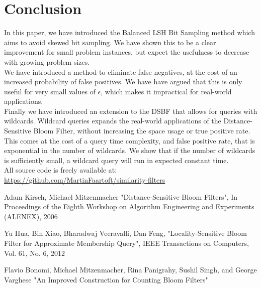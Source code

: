 \documentclass[a4paper,11pt]{article}
\begin{document}
\section{Conclusion}

In this paper, we have introduced the Balanced LSH Bit Sampling method which aims to avoid skewed bit sampling. We have shown this to be a clear improvement for small problem instances, but expect the usefulness to decrease with growing problem sizes.\\

We have introduced a method to eliminate false negatives, at the cost of an increased probability of false positives. We have have argued that this is only useful for very small values of $\epsilon$, which makes it impractical for real-world applications.\\

Finally we have introduced an extension to the DSBF that allows for queries with wildcards. Wildcard queries expands the real-world applications of the Distance-Sensitive Bloom Filter, without increasing the space usage or true positive rate. This comes at the cost of a query time complexity, and false positive rate, that is exponential in the number of wildcards. We show that if the number of wildcards is sufficiently small, a wildcard query will run in expected constant time.\\

All source code is freely available at: \\\url{https://github.com/MartinFaartoft/similarity-filters}

\newpage

\begin{thebibliography}{}

Adam Kirsch, Michael Mitzenmacher
"Distance-Sensitive Bloom Filters", In Proceedings of the Eighth Workshop on Algorithm Engineering and Experiments (ALENEX), 2006

Yu Hua, Bin Xiao, Bharadwaj Veeravalli, Dan Feng, "Locality-Sensitive Bloom Filter for Approximate Membership Query", IEEE Transactions on Computers, Vol. 61, No. 6, 2012


Flavio Bonomi, Michael Mitzenmacher, Rina Panigrahy, Sushil Singh, and George Varghese
"An Improved Construction for Counting Bloom Filters"

\end{thebibliography}
\end{document}
